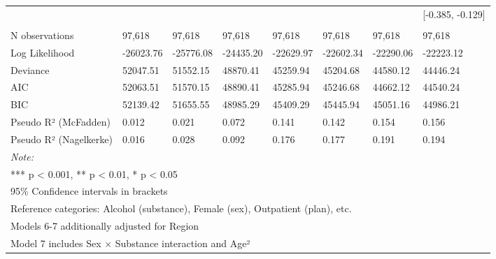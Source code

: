 \documentclass[
  spanish,
  10pt,
]{article}
\begin{document}
\begin{table}[H]
{\begin{tabular}[t]{llllllll}
 &  &  &  &  &  &  & {}[-0.385, -0.129]\\
\addlinespace[0.3em]
\multicolumn{8}{l}{\textbf{Model statistics}}\\
\hspace{1em}N observations & 97,618 & 97,618 & 97,618 & 97,618 & 97,618 & 97,618 & 97,618\\
\hspace{1em}Log Likelihood & -26023.76 & -25776.08 & -24435.20 & -22629.97 & -22602.34 & -22290.06 & -22223.12\\
\hspace{1em}Deviance & 52047.51 & 51552.15 & 48870.41 & 45259.94 & 45204.68 & 44580.12 & 44446.24\\
\hspace{1em}AIC & 52063.51 & 51570.15 & 48890.41 & 45285.94 & 45246.68 & 44662.12 & 44540.24\\
\hspace{1em}BIC & 52139.42 & 51655.55 & 48985.29 & 45409.29 & 45445.94 & 45051.16 & 44986.21\\
\hspace{1em}Pseudo R² (McFadden) & 0.012 & 0.021 & 0.072 & 0.141 & 0.142 & 0.154 & 0.156\\
\hspace{1em}Pseudo R² (Nagelkerke) & 0.016 & 0.028 & 0.092 & 0.176 & 0.177 & 0.191 & 0.194\\
\bottomrule
\multicolumn{8}{l}{\rule{0pt}{1em}\textit{Note: }}\\
\multicolumn{8}{l}{\rule{0pt}{1em}*** p < 0.001, ** p < 0.01, * p < 0.05}\\
\multicolumn{8}{l}{\rule{0pt}{1em}95\% Confidence intervals in brackets}\\
\multicolumn{8}{l}{\rule{0pt}{1em}Reference categories: Alcohol (substance), Female (sex), Outpatient (plan), etc.}\\
\multicolumn{8}{l}{\rule{0pt}{1em}Models 6-7 additionally adjusted for Region}\\
\multicolumn{8}{l}{\rule{0pt}{1em}Model 7 includes Sex × Substance interaction and Age²}\\
\end{tabular}}
\end{table}
\end{document}
